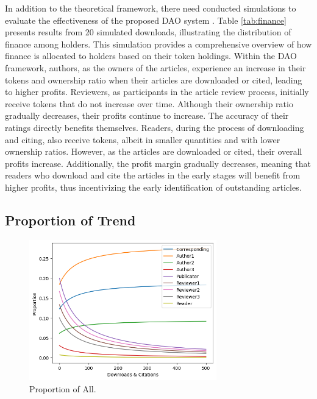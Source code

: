 \documentclass[lettersize,journal]{IEEEtran}
\begin{document}
In addition to the theoretical framework, there need conducted simulations to evaluate the effectiveness of the proposed DAO system \cite{macal2009agent}. Table \ref{tab:finance} presents results from 20 simulated downloads, illustrating the distribution of finance among holders. This simulation provides a comprehensive overview of how finance is allocated to holders based on their token holdings.
Within the DAO framework, authors, as the owners of the articles, experience an increase in their tokens and ownership ratio when their articles are downloaded or cited, leading to higher profits. Reviewers, as participants in the article review process, initially receive tokens that do not increase over time. Although their ownership ratio gradually decreases, their profits continue to increase. The accuracy of their ratings directly benefits themselves. Readers, during the process of downloading and citing, also receive tokens, albeit in smaller quantities and with lower ownership ratios. However, as the articles are downloaded or cited, their overall profits increase. Additionally, the profit margin gradually decreases, meaning that readers who download and cite the articles in the early stages will benefit from higher profits, thus incentivizing the early identification of outstanding articles.


\subsection{Proportion of Trend}


\begin{figure}[h]
  \centering
  \includegraphics[width=3.2in]{assets/proportion-all.png}
  \caption{Proportion of All.}
  \label{fig:proportion-all}
\end{figure}
\end{document}
